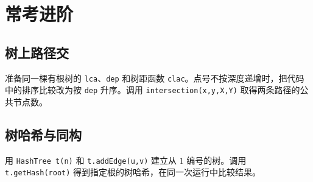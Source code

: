 
\section{常考进阶}

\subsection{树上路径交}

准备同一棵有根树的 \texttt{lca}、\texttt{dep} 和树距函数 \texttt{clac}。点号不按深度递增时，把代码中的排序比较改为按 \texttt{dep} 升序。调用 \texttt{intersection(x,y,X,Y)} 取得两条路径的公共节点数。


\subsection{树哈希与同构}

用 \texttt{HashTree t(n)} 和 \texttt{t.addEdge(u,v)} 建立从 $1$ 编号的树。调用 \texttt{t.getHash(root)} 得到指定根的树哈希，在同一次运行中比较结果。

